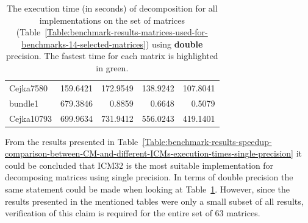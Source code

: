 \begin{table}[ht!]
\begin{tabular}{|>{\footnotesize}l|>{\raggedleft\arraybackslash\footnotesize}r|>{\raggedleft\arraybackslash\footnotesize}r|>{\raggedleft\arraybackslash\footnotesize}r|>{\raggedleft\arraybackslash\footnotesize}r|}
		Cejka7580		&                   159.6421 &                   172.9549 &                   138.9242 & \cellcolor{green!25}107.8041 \\
		bundle1         &                   679.3846 &                     0.8859 &                     0.6648 & \cellcolor{green!25}  0.5079 \\
		Cejka10793      &                   699.9634 &                   731.9412 &                   556.0243 & \cellcolor{green!25}419.1401 \\ \hline
	\end{tabular}
	\caption{The execution time (in seconds) of decomposition for all implementations on the set of matrices (Table~\ref{Table:benchmark-results-matrices-used-for-benchmarks-14-selected-matrices}) using \textbf{double} precision. The fastest time for each matrix is highlighted in green.}
	\label{Table:benchmark-results-speedup-comparison-between-CM-and-different-ICMs-execution-times-double-precision}
\end{table}

From the results presented in Table~\ref{Table:benchmark-results-speedup-comparison-between-CM-and-different-ICMs-execution-times-single-precision} it could be concluded that ICM32 is the most suitable implementation for decomposing matrices using single precision. In terms of double precision the same statement could be made when looking at Table~\ref{Table:benchmark-results-speedup-comparison-between-CM-and-different-ICMs-execution-times-double-precision}. However, since the results presented in the mentioned tables were only a small subset of all results, verification of this claim is required for the entire set of 63 matrices.

